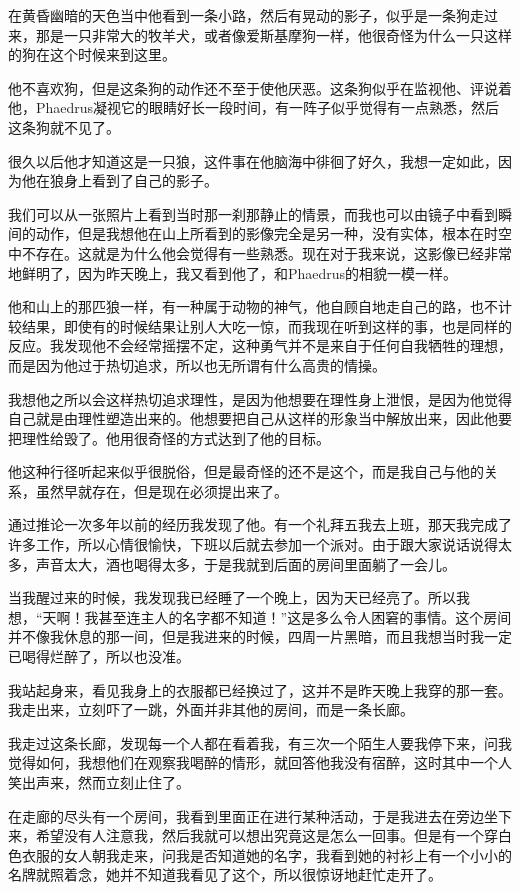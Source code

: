 \documentclass[UTF8]{article}
\begin{document}
\par 在黄昏幽暗的天色当中他看到一条小路，然后有晃动的影子，似乎是一条狗走过来，那是一只非常大的牧羊犬，或者像爱斯基摩狗一样，他很奇怪为什么一只这样的狗在这个时候来到这里。
\par 他不喜欢狗，但是这条狗的动作还不至于使他厌恶。这条狗似乎在监视他、评说着他，Phaedrus凝视它的眼睛好长一段时间，有一阵子似乎觉得有一点熟悉，然后这条狗就不见了。
\par 很久以后他才知道这是一只狼，这件事在他脑海中徘徊了好久，我想一定如此，因为他在狼身上看到了自己的影子。
\par 我们可以从一张照片上看到当时那一刹那静止的情景，而我也可以由镜子中看到瞬间的动作，但是我想他在山上所看到的影像完全是另一种，没有实体，根本在时空中不存在。这就是为什么他会觉得有一些熟悉。现在对于我来说，这影像已经非常地鲜明了，因为昨天晚上，我又看到他了，和Phaedrus的相貌一模一样。
\par 他和山上的那匹狼一样，有一种属于动物的神气，他自顾自地走自己的路，也不计较结果，即使有的时候结果让别人大吃一惊，而我现在听到这样的事，也是同样的反应。我发现他不会经常摇摆不定，这种勇气并不是来自于任何自我牺牲的理想，而是因为他过于热切追求，所以也无所谓有什么高贵的情操。
\par 我想他之所以会这样热切追求理性，是因为他想要在理性身上泄恨，是因为他觉得自己就是由理性塑造出来的。他想要把自己从这样的形象当中解放出来，因此他要把理性给毁了。他用很奇怪的方式达到了他的目标。
\par 他这种行径听起来似乎很脱俗，但是最奇怪的还不是这个，而是我自己与他的关系，虽然早就存在，但是现在必须提出来了。
\par 通过推论一次多年以前的经历我发现了他。有一个礼拜五我去上班，那天我完成了许多工作，所以心情很愉快，下班以后就去参加一个派对。由于跟大家说话说得太多，声音太大，酒也喝得太多，于是我就到后面的房间里面躺了一会儿。
\par 当我醒过来的时候，我发现我已经睡了一个晚上，因为天已经亮了。所以我想，“天啊！我甚至连主人的名字都不知道！”这是多么令人困窘的事情。这个房间并不像我休息的那一间，但是我进来的时候，四周一片黑暗，而且我想当时我一定已喝得烂醉了，所以也没准。
\par 我站起身来，看见我身上的衣服都已经换过了，这并不是昨天晚上我穿的那一套。我走出来，立刻吓了一跳，外面并非其他的房间，而是一条长廊。
\par 我走过这条长廊，发现每一个人都在看着我，有三次一个陌生人要我停下来，问我觉得如何，我想他们在观察我喝醉的情形，就回答他我没有宿醉，这时其中一个人笑出声来，然而立刻止住了。
\par 在走廊的尽头有一个房间，我看到里面正在进行某种活动，于是我进去在旁边坐下来，希望没有人注意我，然后我就可以想出究竟这是怎么一回事。但是有一个穿白色衣服的女人朝我走来，问我是否知道她的名字，我看到她的衬衫上有一个小小的名牌就照着念，她并不知道我看见了这个，所以很惊讶地赶忙走开了。
\end{document}
